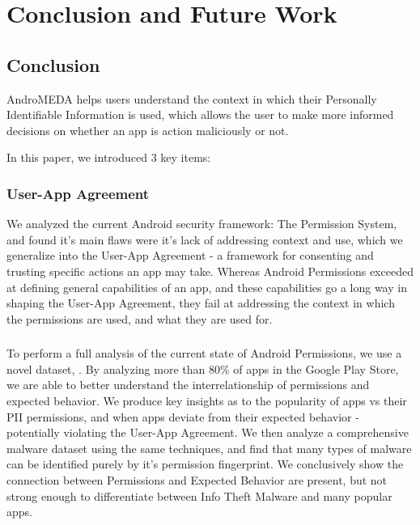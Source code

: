\chapter{Conclusion and Future Work}
\label{sec:conclusion}
\section{Conclusion}
AndroMEDA helps users understand the context in which their Personally Identifiable Information is used, which allows the user to make more informed decisions on whether an app is action maliciously or not. 

In this paper, we introduced 3 key items:
\subsection{User-App Agreement}

We analyzed the current Android security framework: The Permission System, and found it's main flaws were it's lack of addressing context and use, which we generalize into the User-App Agreement - a framework for consenting and trusting specific actions an app may take. Whereas Android Permissions exceeded at defining general capabilities of an app, and these capabilities go a long way in shaping the User-App Agreement, they fail at addressing the context in which the permissions are used, and what they are used for.

\subsection{}
To perform a full analysis of the current state of Android Permissions, we use a novel dataset, . By analyzing more than 80\% of apps in the Google Play Store, we are able to better understand the interrelationship of permissions and expected behavior. We produce key insights as to the popularity of apps vs their PII permissions, and when apps deviate from their expected behavior - potentially violating the User-App Agreement. We then analyze a comprehensive malware dataset using the same techniques, and find that many types of malware can be identified purely by it's permission fingerprint. We conclusively show the connection between Permissions and Expected Behavior are present, but not strong enough to differentiate between Info Theft Malware and many popular apps.

